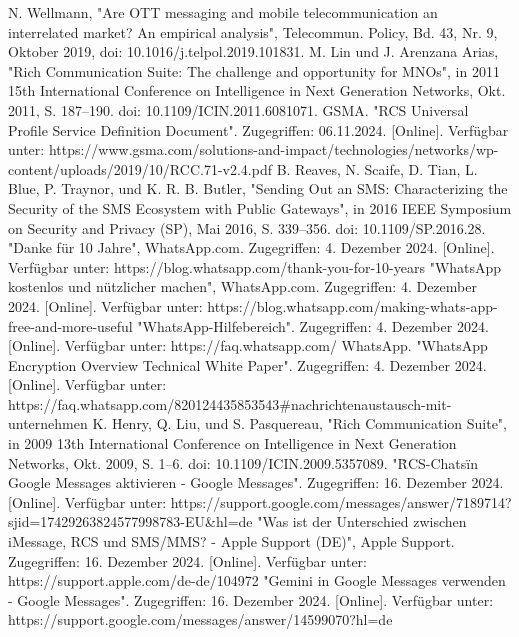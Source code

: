 \documentclass[conference]{IEEEtran}
\begin{document}
\begin{thebibliography}{00}
     N. Wellmann, "Are OTT messaging and mobile telecommunication an interrelated market? An empirical analysis", Telecommun. Policy, Bd. 43, Nr. 9, Oktober 2019, doi: 10.1016/j.telpol.2019.101831.
     M. Lin und J. Arenzana Arias, "Rich Communication Suite: The challenge and opportunity for MNOs", in 2011 15th International Conference on Intelligence in Next Generation Networks, Okt. 2011, S. 187–190. doi: 10.1109/ICIN.2011.6081071.
     GSMA. "RCS Universal Profile Service Definition Document". Zugegriffen: 06.11.2024. [Online]. Verfügbar unter: https://www.gsma.com/solutions-and-impact/technologies/networks/wp-content/uploads/2019/10/RCC.71-v2.4.pdf
     B. Reaves, N. Scaife, D. Tian, L. Blue, P. Traynor, und K. R. B. Butler, "Sending Out an SMS: Characterizing the Security of the SMS Ecosystem with Public Gateways", in 2016 IEEE Symposium on Security and Privacy (SP), Mai 2016, S. 339–356. doi: 10.1109/SP.2016.28.
     "Danke für 10 Jahre", WhatsApp.com. Zugegriffen: 4. Dezember 2024. [Online]. Verfügbar unter: https://blog.whatsapp.com/thank-you-for-10-years
     "WhatsApp kostenlos und nützlicher machen", WhatsApp.com. Zugegriffen: 4. Dezember 2024. [Online]. Verfügbar unter: https://blog.whatsapp.com/making-whats-app-free-and-more-useful
     "WhatsApp-Hilfebereich". Zugegriffen: 4. Dezember 2024. [Online]. Verfügbar unter: https://faq.whatsapp.com/
     WhatsApp. "WhatsApp Encryption Overview Technical White Paper". Zugegriffen: 4. Dezember 2024. [Online]. Verfügbar unter: https://faq.whatsapp.com/820124435853543\#nachrichtenaustausch-mit-unternehmen
     K. Henry, Q. Liu, und S. Pasquereau, "Rich Communication Suite", in 2009 13th International Conference on Intelligence in Next Generation Networks, Okt. 2009, S. 1–6. doi: 10.1109/ICIN.2009.5357089.
     "\"RCS-Chats\" in Google Messages aktivieren - Google Messages". Zugegriffen: 16. Dezember 2024. [Online]. Verfügbar unter: https://support.google.com/messages/answer/7189714?sjid=17429263824577998783-EU\&hl=de
     "Was ist der Unterschied zwischen iMessage, RCS und SMS/MMS? - Apple Support (DE)", Apple Support. Zugegriffen: 16. Dezember 2024. [Online]. Verfügbar unter: https://support.apple.com/de-de/104972
     "Gemini in Google Messages verwenden - Google Messages". Zugegriffen: 16. Dezember 2024. [Online]. Verfügbar unter: https://support.google.com/messages/answer/14599070?hl=de
\end{thebibliography}
\end{document}
